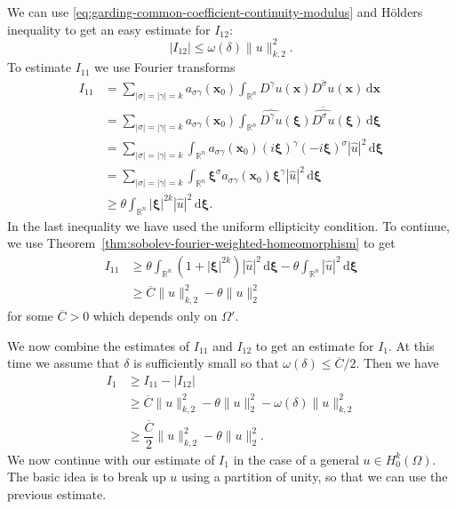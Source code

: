 \begin{Proof}
We can use \eqref{eq:garding-common-coefficient-continuity-modulus} and Hölder\textquotesingle s inequality to get an easy estimate for $I_{12}$:
\begin{equation}\label{eq:garding-coefficient-variation-modulus-bound}
|I_{12}|\leq\omega(\delta)\|u\|_{k,2}^2.
\end{equation}
To estimate $I_{11}$ we use Fourier transforms\[\begin{aligned}
I_{11}&=\sum_{|\sigma|=|\gamma|=k}a_{\sigma\gamma}(\bm{x}_0)\int_{\mathbb{R}^n}D^\gamma u(\bm{x})\overline{D^\sigma u}(\bm{x})\,\mathrm{d}\bm{x}\\
&=\sum_{|\sigma|=|\gamma|=k}a_{\sigma\gamma}(\bm{x}_0)\int_{\mathbb{R}^n}\widehat{D^\gamma u}(\bm{\xi})\overline{\widehat{D^\sigma u}}(\bm{\xi})\,\mathrm{d}\bm{\xi}\\
&=\sum_{|\sigma|=|\gamma|=k}\int_{\mathbb{R}^n}a_{\sigma\gamma}(\bm{x}_0)(i\bm{\xi})^\gamma(-i\bm{\xi})^\sigma|\widehat u|^2\,\mathrm{d}\bm{\xi}\\
&=\sum_{|\sigma|=|\gamma|=k}\int_{\mathbb{R}^n}\bm{\xi}^\sigma a_{\sigma\gamma}(\bm{x}_0)\bm{\xi}^\gamma|\widehat u|^2\,\mathrm{d}\bm{\xi}\\
&\geq\theta\int_{\mathbb{R}^n}|\bm{\xi}|^{2k}|\widehat u|^2\,\mathrm{d}\bm{\xi}.
\end{aligned}\]In the last inequality we have used the uniform ellipticity condition. To continue, we use Theorem~\ref{thm:sobolev-fourier-weighted-homeomorphism} to get\[\begin{aligned}
I_{11}&\geq\theta\int_{\mathbb{R}^n}(1+|\bm{\xi}|^{2k})|\widehat u|^2\,\mathrm{d}\bm{\xi}-\theta\int_{\mathbb{R}^n}|\widehat u|^2\,\mathrm{d}\bm{\xi}\\
&\geq\overline C\|u\|_{k,2}^2-\theta\|u\|_2^2
\end{aligned}\]for some $\overline C>0$ which depends only on $\Omega\prime$.

We now combine the estimates of $I_{11}$ and $I_{12}$ to get an estimate for $I_1$. At this time we assume that $\delta$ is sufficiently small so that $\omega(\delta)\leq\overline C/2$. Then we have
\begin{equation}\label{eq:garding-ball-local-principal-part-bound}
\begin{aligned}
I_1&\geq I_{11}-|I_{12}|\\
&\geq\overline C\|u\|_{k,2}^2-\theta\|u\|_2^2-\omega(\delta)\|u\|_{k,2}^2\\
&\geq\dfrac{\overline C}{2}\|u\|_{k,2}^2-\theta\|u\|_2^2.
\end{aligned}
\end{equation}
We now continue with our estimate of $I_1$ in the case of a general $u\in H_0^k(\Omega)$. The basic idea is to break up $u$ using a partition of unity, so that we can use the previous estimate.


\end{Proof}
